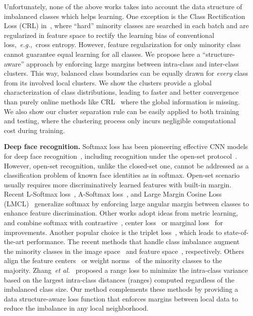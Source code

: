 \documentclass[10pt,journal,compsoc]{IEEEtran}
\newcommand{\etal}{\emph{et al.}}
\newcommand{\eg}{\emph{e.g.}}
\begin{document}

Unfortunately, none of the above works takes into account the data structure of imbalanced classes which helps learning. One exception is the Class Rectification Loss (CRL) in~\cite{Dong_2017_ICCV}, where ``hard'' minority classes are searched in each batch and are regularized in feature space to rectify the learning bias of conventional loss,~\eg,~cross entropy. However, feature regularization for only minority class cannot guarantee equal learning for all classes. We propose here a ``structure-aware'' approach by enforcing large margins between intra-class and inter-class clusters. This way, balanced class boundaries can be equally drawn for \textit{every} class from its involved local clusters. We show the clusters provide a global characterization of class distributions, leading to faster and better convergence than purely online methods like CRL~\cite{Dong_2017_ICCV} where the global information is missing. We also show our cluster separation rule can be easily applied to both training and testing, where the clustering process only incurs negligible computational cost during training.

\noindent
{\bf Deep face recognition.} Softmax loss has been pioneering effective CNN models for deep face recognition~\cite{LFWTech,kemelmacher2016megaface}, including recognition under the open-set protocol~\cite{Taigman14}. However, open-set recognition, unlike the closed-set one, cannot be addressed as a classification problem of known face identities as in softmax. Open-set scenario usually requires more discriminatively learned features with built-in margin. Recent L-Softmax loss~\cite{Liu2016}, A-Softmax loss~\cite{liu2017sphereface}, and Large Margin Cosine Loss (LMCL)~\cite{2018Wang} generalize softmax by enforcing large angular margin between classes to enhance feature discrimination. Other works adopt ideas from metric learning, and combine softmax with contrastive~\cite{Yi14,SunWT15,YiLLL14a}, center loss~\cite{wen2016} or marginal loss~\cite{Deng_8014985} for improvements. Another popular choice is the triplet loss~\cite{Schroff15,LiuDBH15}, which leads to state-of-the-art performance. The recent methods that handle class imbalance augment the minority classes in the image space~\cite{2016_dowe} and feature space~\cite{2018arXiv180309014Y}, respectively. Others align the feature centers~\cite{Wu_2017} or weight norms~\cite{Yandong17} of the minority classes to the majority. Zhang~\etal~\cite{Zhang_8237840} proposed a range loss to minimize the intra-class variance based on the largest intra-class distances (ranges) computed regardless of the imbalanced class size. Our method complements these methods by providing a data structure-aware loss function that enforces margins between local data to reduce the imbalance in any local neighborhood.
\end{document}
